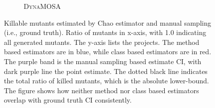 \documentclass[sigconf]{acmart}
\newcommand{\Chao}{Chao\xspace}
\newcommand{\EvosuiteDynamosa}{\textsc{DynaMOSA}\xspace}
\begin{document}
\begin{figure}
\begin{subfigure}{.27\textwidth}
\caption{\EvosuiteDynamosa} %
\label{fig:groundtruth2}
\end{subfigure}
\caption{Killable mutants estimated by %
 \Chao estimator and manual sampling (i.e., ground truth). %
Ratio of mutants in x-axis, with 1.0 indicating all generated mutants. The y-axis lists the projects.
  The method based estimators are in \textcolor{cmethod}{blue}, while class based estimators are in \textcolor{cclass}{red}.
  The \textcolor{cgroundtruth}{purple} band is the manual sampling based estimate CI, %
   with dark purple line the point estimate.
  The dotted black line indicates the total
  ratio of killed mutants, which is the absolute lower-bound. The figure shows how neither \textcolor{cmethod}{method} nor \textcolor{cclass}{class}
  based estimators overlap with \textcolor{cgroundtruth}{ground truth CI} consistently.}
\label{fig:groundtruth}
\end{figure}
\end{document}
